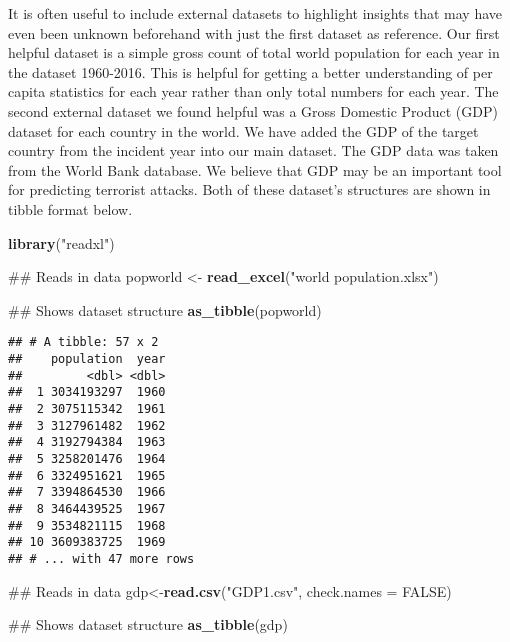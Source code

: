 \documentclass[11pt,letterpaper,]{article}
\newenvironment{Shaded}{\begin{snugshade}}{\end{snugshade}}
\newcommand{\KeywordTok}[1]{\textcolor[rgb]{0.13,0.29,0.53}{\textbf{{#1}}}}
\newcommand{\DataTypeTok}[1]{\textcolor[rgb]{0.13,0.29,0.53}{{#1}}}
\newcommand{\StringTok}[1]{\textcolor[rgb]{0.31,0.60,0.02}{{#1}}}
\newcommand{\OtherTok}[1]{\textcolor[rgb]{0.56,0.35,0.01}{{#1}}}
\newcommand{\NormalTok}[1]{{#1}}
\theoremstyle{definition}
\theoremstyle{definition}
\theoremstyle{definition}
\theoremstyle{remark}
\begin{document}
It is often useful to include external datasets to highlight insights
that may have even been unknown beforehand with just the first dataset
as reference. Our first helpful dataset is a simple gross count of total
world population for each year in the dataset 1960-2016. This is helpful
for getting a better understanding of per capita statistics for each
year rather than only total numbers for each year. The second external
dataset we found helpful was a Gross Domestic Product (GDP) dataset for
each country in the world. We have added the GDP of the target country
from the incident year into our main dataset. The GDP data was taken
from the World Bank database. We believe that GDP may be an important
tool for predicting terrorist attacks. Both of these dataset's
structures are shown in tibble format below.

\begin{Shaded}
\begin{Highlighting}[]
\KeywordTok{library}\NormalTok{(}\StringTok{"readxl"}\NormalTok{)}

\NormalTok{## Reads in data}
\NormalTok{popworld <-}\StringTok{ }\KeywordTok{read_excel}\NormalTok{(}\StringTok{"world population.xlsx"}\NormalTok{)}

\NormalTok{## Shows dataset structure}
\KeywordTok{as_tibble}\NormalTok{(popworld)}
\end{Highlighting}
\end{Shaded}

\begin{verbatim}
## # A tibble: 57 x 2
##    population  year
##         <dbl> <dbl>
##  1 3034193297  1960
##  2 3075115342  1961
##  3 3127961482  1962
##  4 3192794384  1963
##  5 3258201476  1964
##  6 3324951621  1965
##  7 3394864530  1966
##  8 3464439525  1967
##  9 3534821115  1968
## 10 3609383725  1969
## # ... with 47 more rows
\end{verbatim}

\begin{Shaded}
\begin{Highlighting}[]
\NormalTok{## Reads in data}
\NormalTok{gdp<-}\KeywordTok{read.csv}\NormalTok{(}\StringTok{"GDP1.csv"}\NormalTok{, }\DataTypeTok{check.names =} \OtherTok{FALSE}\NormalTok{)}

\NormalTok{## Shows dataset structure}
\KeywordTok{as_tibble}\NormalTok{(gdp)}
\end{Highlighting}
\end{Shaded}
\end{document}
